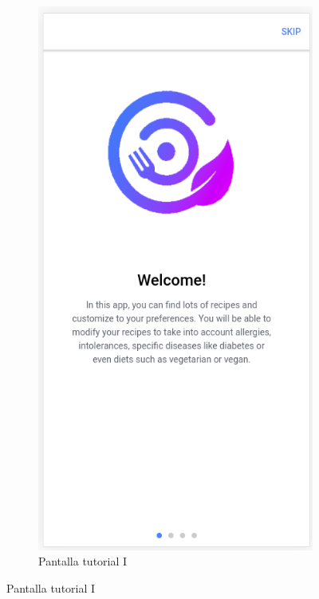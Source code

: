 \begin{figure}[H]
    \centering
    \begin{subfigure}[b]{0.31
    \linewidth}
        \includegraphics[width=\linewidth]{imagenes/app/pantallas/app_tutorial1.png}
        \caption{Pantalla tutorial I}

\end{subfigure}
\end{figure}
